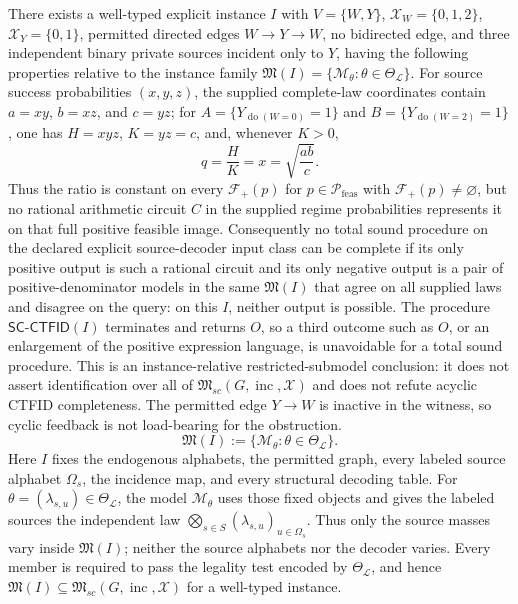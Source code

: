 There exists a well-typed explicit instance \(I\) with \(V=\{W,Y\}\), \(\mathcal X_W=\{0,1,2\}\), \(\mathcal X_Y=\{0,1\}\), permitted directed edges \(W\to Y\to W\), no bidirected edge, and three independent binary private sources incident only to \(Y\), having the following properties relative to the instance family \(\mathfrak M(I)=\{\mathcal M_\theta:\theta\in\Theta_{\mathcal L}\}\).  For source success probabilities \((x,y,z)\), the supplied complete-law coordinates contain \(a=xy\), \(b=xz\), and \(c=yz\); for \(A=\{Y_{\operatorname{do}(W=0)}=1\}\) and \(B=\{Y_{\operatorname{do}(W=2)}=1\}\), one has \(H=xyz\), \(K=yz=c\), and, whenever \(K>0\),
\[
 q=\frac{H}{K}=x=\sqrt{\frac{ab}{c}}.
\]
Thus the ratio is constant on every \(\mathcal F_+(p)\) for \(p\in\mathcal P_{\mathrm{feas}}\) with \(\mathcal F_+(p)\neq\varnothing\), but no rational arithmetic circuit \(C\) in the supplied regime probabilities represents it on that full positive feasible image.  Consequently no total sound procedure on the declared explicit source-decoder input class can be complete if its only positive output is such a rational circuit and its only negative output is a pair of positive-denominator models in the same \(\mathfrak M(I)\) that agree on all supplied laws and disagree on the query: on this \(I\), neither output is possible.  The procedure \(\mathsf{SC\mbox{-}CTFID}(I)\) terminates and returns \(O\), so a third outcome such as \(O\), or an enlargement of the positive expression language, is unavoidable for a total sound procedure.  This is an instance-relative restricted-submodel conclusion: it does not assert identification over all of \(\mathfrak M_{sc}(G,\operatorname{inc},\mathcal X)\) and does not refute acyclic CTFID completeness.  The permitted edge \(Y\to W\) is inactive in the witness, so cyclic feedback is not load-bearing for the obstruction.
\[
 \mathfrak M(I):=\{\mathcal M_\theta:\theta\in\Theta_{\mathcal L}\}.
\]
Here \(I\) fixes the endogenous alphabets, the permitted graph, every labeled source alphabet \(\Omega_s\), the incidence map, and every structural decoding table.  For \(\theta=(\lambda_{s,u})\in\Theta_{\mathcal L}\), the model \(\mathcal M_\theta\) uses those fixed objects and gives the labeled sources the independent law \(\bigotimes_{s\in S}(\lambda_{s,u})_{u\in\Omega_s}\).  Thus only the source masses vary inside \(\mathfrak M(I)\); neither the source alphabets nor the decoder varies.  Every member is required to pass the legality test encoded by \(\Theta_{\mathcal L}\), and hence \(\mathfrak M(I)\subseteq\mathfrak M_{sc}(G,\operatorname{inc},\mathcal X)\) for a well-typed instance.
